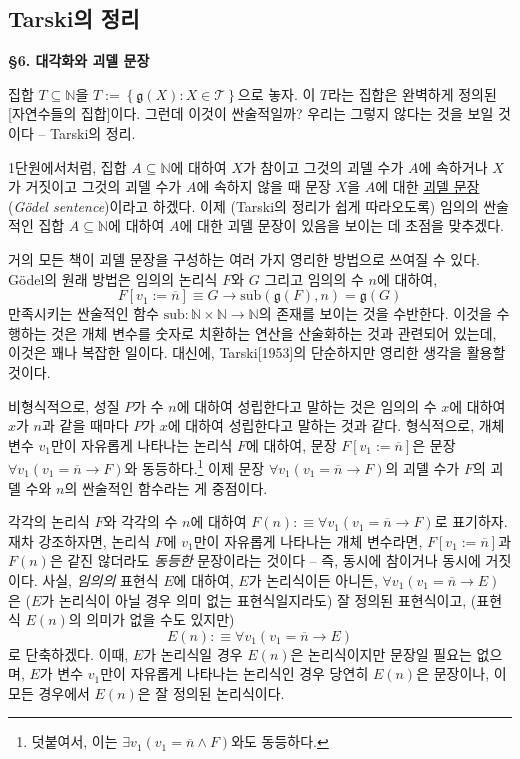 \documentclass[12pt]{paper}
\newcommand{\gnum}
{ \mathfrak{g} }
\begin{document}
\subsection{Tarski의 정리}
\hspace{12pt}

\noindent \textbf{\S 6. 대각화와 괴델 문장}

집합 $T \subseteq \mathbb{N}$을 $T := \left\{ \gnum \left( X \right) : X \in \mathcal{T} \right\}$으로 놓자.
이 $T$라는 집합은 완벽하게 정의된 [자연수들의 집합]이다.
그런데 이것이 싼술적일까?
우리는 그렇지 않다는 것을 보일 것이다 -- Tarski의 정리.

1단원에서처럼, 집합 $A \subseteq \mathbb{N}$에 대하여
$X$가 참이고 그것의 괴델 수가 $A$에 속하거나 $X$가 거짓이고 그것의 괴델 수가 $A$에 속하지 않을 때
문장 $X$을 $A$에 대한 \underline{괴델 문장}(\textit{G\"odel sentence})이라고 하겠다.
이제 (Tarski의 정리가 쉽게 따라오도록)
임의의 싼술적인 집합 $A \subseteq \mathbb{N}$에 대하여
$A$에 대한 괴델 문장이 있음을 보이는 데 초점을 맞추겠다.

거의 모든 책이 괴델 문장을 구성하는 여러 가지 영리한 방법으로 쓰여질 수 있다.
G\"odel의 원래 방법은 임의의 논리식 $F$와 $G$ 그리고 임의의 수 $n$에 대하여,
$$F \left[ v_1 := \overline{n} \right] \equiv G \rightarrow \mathrm{sub} \left( \gnum \left( F \right) , n \right) = \gnum \left( G \right)$$
만족시키는 싼술적인 함수 $\mathrm{sub} : \mathbb{N} \times \mathbb{N} \to \mathbb{N}$의 존재를 보이는 것을 수반한다.
이것을 수행하는 것은 개체 변수를 숫자로 치환하는 연산을 산술화하는 것과 관련되어 있는데,
이것은 꽤나 복잡한 일이다.
대신에, Tarski[1953]의 단순하지만 영리한 생각을 활용할 것이다.

비형식적으로, 성질 $P$가 수 $n$에 대하여 성립한다고 말하는 것은
임의의 수 $x$에 대하여 $x$가 $n$과 같을 때마다 $P$가 $x$에 대하여 성립한다고 말하는 것과 같다.
형식적으로, 개체 변수 $v_1$만이 자유롭게 나타나는 논리식 $F$에 대하여,
문장 $F \left[ v_1 := \overline{n} \right]$은 문장 $\forall v_1 \left( v_1 = \overline{n} \rightarrow F \right)$와 동등하다.\footnote
{
덧붙여서, 이는 $\exists v_1 \left( v_1 = \overline{n} \land F \right)$와도 동등하다.
}
이제 문장 $\forall v_1 \left( v_1 = \overline{n} \rightarrow F \right)$의 괴델 수가 $F$의 괴델 수와 $n$의 싼술적인 함수라는 게 중점이다.

각각의 논리식 $F$와 각각의 수 $n$에 대하여 $F \left( n \right) : \equiv \forall v_1 \left( v_1 = \overline{n} \rightarrow F \right)$로 표기하자.
재차 강조하자면, 논리식 $F$에 $v_1$만이 자유롭게 나타나는 개체 변수라면,
$F \left[ v_1 := \overline{n} \right]$과 $F \left( n \right)$은 같진 않더라도 \textit{동등한} 문장이라는 것이다 --
즉, 동시에 참이거나 동시에 거짓이다.
사실, \textit{임의의} 표현식 $E$에 대하여, $E$가 논리식이든 아니든,
$\forall v_1 \left( v_1 = \overline{n} \rightarrow E \right)$은 ($E$가 논리식이 아닐 경우 의미 없는 표현식일지라도) 잘 정의된 표현식이고,
(표현식 $E \left( n \right)$의 의미가 없을 수도 있지만) $$E \left( n \right) : \equiv \forall v_1 \left( v_1 = \overline{n} \rightarrow E \right)$$로 단축하겠다.
이때, $E$가 논리식일 경우 $E \left( n \right)$은 논리식이지만 문장일 필요는 없으며,
$E$가 변수 $v_1$만이 자유롭게 나타나는 논리식인 경우 당연히 $E \left( n \right)$은 문장이나,
이 모든 경우에서 $E \left( n \right)$은 잘 정의된 논리식이다.
\end{document}
